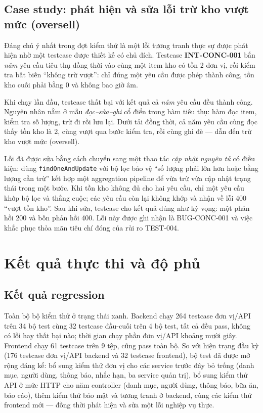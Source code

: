 \documentclass[12pt,a4paper]{article}
\newcommand{\code}[1]{\texttt{#1}}
\begin{document}
\subsection{Case study: phát hiện và sửa lỗi trừ kho vượt mức (oversell)}

Đáng chú ý nhất trong đợt kiểm thử là một lỗi tương tranh thực sự được phát hiện nhờ một testcase được thiết
kế có chủ đích. Testcase \textbf{INT-CONC-001} bắn \emph{năm} yêu cầu tiêu thụ đồng thời vào cùng một item
kho có tồn 2 đơn vị, rồi kiểm tra bất biến ``không trừ vượt'': chỉ đúng một yêu cầu được phép thành công,
tồn kho cuối phải bằng 0 và không bao giờ âm.

Khi chạy lần đầu, testcase thất bại với kết quả cả \emph{năm} yêu cầu đều thành công. Nguyên nhân nằm ở mẫu
\emph{đọc--sửa--ghi} cổ điển trong hàm tiêu thụ: hàm đọc item, kiểm tra số lượng, trừ đi rồi lưu lại. Dưới
tải đồng thời, cả năm yêu cầu cùng đọc thấy tồn kho là 2, cùng vượt qua bước kiểm tra, rồi cùng ghi đè ---
dẫn đến trừ kho vượt mức (oversell).

Lỗi đã được sửa bằng cách chuyển sang một thao tác \emph{cập nhật nguyên tử} có điều kiện: dùng
\code{findOneAndUpdate} với bộ lọc bảo vệ ``số lượng phải lớn hơn hoặc bằng lượng cần trừ'' kết hợp một
aggregation pipeline để vừa trừ vừa cập nhật trạng thái trong một bước. Khi tồn kho không đủ cho hai yêu cầu,
chỉ một yêu cầu khớp bộ lọc và thắng cuộc; các yêu cầu còn lại không khớp và nhận về lỗi 400 ``vượt tồn
kho''. Sau khi sửa, testcase cho kết quả đúng như kỳ vọng: một phản hồi 200 và bốn phản hồi 400. Lỗi này
được ghi nhận là BUG-CONC-001 và việc khắc phục thỏa mãn tiêu chí đóng của rủi ro TEST-004.

\section{Kết quả thực thi và độ phủ}

\subsection{Kết quả regression}

Toàn bộ bộ kiểm thử ở trạng thái xanh. Backend chạy 264 testcase đơn vị/API trên 34 bộ test cùng 32 testcase
đầu-cuối trên 4 bộ test, tất cả đều pass, không có lỗi hay thất bại nào; thời gian chạy phần đơn vị/API
khoảng mười giây. Frontend chạy 61 testcase trên 9 tệp, cũng pass toàn bộ. So với hiện trạng đầu kỳ (176
testcase đơn vị/API backend và 32 testcase frontend), bộ test đã được mở rộng đáng kể: bổ sung kiểm thử đơn
vị cho các service trước đây bỏ trống (danh mục, người dùng, thông báo, nhắc hạn, ba service quản trị), bổ
sung kiểm thử API ở mức HTTP cho năm controller (danh mục, người dùng, thông báo, bữa ăn, báo cáo), thêm
kiểm thử bảo mật và tương tranh ở backend, cùng các kiểm thử frontend mới --- đồng thời phát hiện và sửa một
lỗi nghiệp vụ thực.
\end{document}
